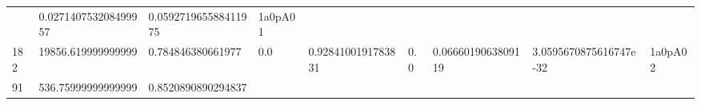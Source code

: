 \documentclass[11pt,a4paper,twoside]{book}
\theoremstyle{definition}
\theoremstyle{definition}
\theoremstyle{remark}
\begin{document}
\begin{longtable}[]{@{}lllllllll@{}}
\begin{minipage}[t]{0.04\columnwidth}
\end{minipage} & \begin{minipage}[t]{0.04\columnwidth}\raggedright\strut
0.027140753208499957\strut
\end{minipage} & \begin{minipage}[t]{0.04\columnwidth}\raggedright\strut
0.059271965588411975\strut
\end{minipage} & \begin{minipage}[t]{0.04\columnwidth}\raggedright\strut
1a0pA01\strut
\end{minipage}\tabularnewline
\begin{minipage}[t]{0.04\columnwidth}\raggedright\strut
182\strut
\end{minipage} & \begin{minipage}[t]{0.04\columnwidth}\raggedright\strut
19856.619999999999\strut
\end{minipage} & \begin{minipage}[t]{0.04\columnwidth}\raggedright\strut
0.784846380661977\strut
\end{minipage} & \begin{minipage}[t]{0.04\columnwidth}\raggedright\strut
0.0\strut
\end{minipage} & \begin{minipage}[t]{0.04\columnwidth}\raggedright\strut
0.9284100191783831\strut
\end{minipage} & \begin{minipage}[t]{0.04\columnwidth}\raggedright\strut
0.0\strut
\end{minipage} & \begin{minipage}[t]{0.04\columnwidth}\raggedright\strut
0.0666019063809119\strut
\end{minipage} & \begin{minipage}[t]{0.04\columnwidth}\raggedright\strut
3.0595670875616747e-32\strut
\end{minipage} & \begin{minipage}[t]{0.04\columnwidth}\raggedright\strut
1a0pA02\strut
\end{minipage}\tabularnewline
\begin{minipage}[t]{0.04\columnwidth}\raggedright\strut
91\strut
\end{minipage} & \begin{minipage}[t]{0.04\columnwidth}\raggedright\strut
536.75999999999999\strut
\end{minipage} & \begin{minipage}[t]{0.04\columnwidth}\raggedright\strut
0.8520890890294837\strut

\end{minipage}
\end{longtable}
\end{document}
